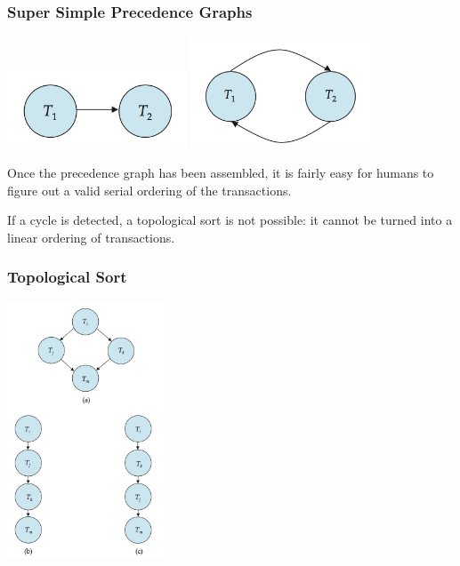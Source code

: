 \begin{frame}
\frametitle{Super Simple Precedence Graphs}

\begin{center}
\includegraphics[width=0.4\textwidth]{images/precedence-1}
\includegraphics[width=0.4\textwidth]{images/precedence-2}
\end{center}

Once the precedence graph has been assembled, it is fairly easy for humans to figure out a valid serial ordering of the transactions. 

If a cycle is detected, a topological sort is not possible: it cannot be turned into a linear ordering of transactions. 

\end{frame}

\begin{frame}
\frametitle{Topological Sort}

\begin{center}
\includegraphics[width=0.35\textwidth]{images/topological}
\end{center}


\end{frame}


